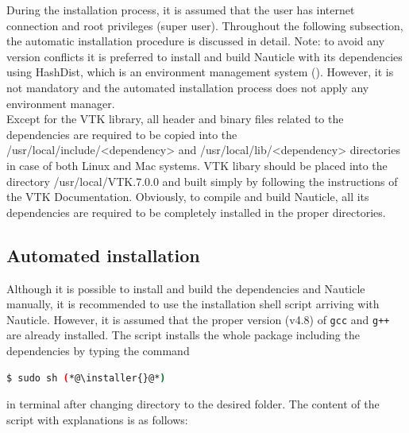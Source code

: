 \documentclass[a4paper,12pt,openany]{book}
\newcommand{\myhref}[3][nauticlegreen_dark]{\href{#2}{\color{#1}{#3}}}%
\theoremstyle{break}
\begin{document}
During the installation process, it is assumed that the user has internet connection and root privileges (super user). Throughout the following subsection, the automatic installation procedure is discussed in detail.
Note: to avoid any version conflicts it is preferred to install and build Nauticle with its dependencies using HashDist, which is an environment management system (\myhref{https://github.com/hashdist/hashdist}{https://github.com/hashdist/ hashdist}). However, it is not mandatory and the automated installation process does not apply any environment manager. \\
Except for the VTK library, all header and binary files related to the dependencies are required to be copied into the /usr/local/include/<dependency> and /usr/local/lib/<dependency> directories in case of both Linux and Mac systems. VTK libary should be placed into the directory /usr/local/VTK.7.0.0 and built simply by following the instructions of the VTK Documentation. Obviously, to compile and build Nauticle, all its dependencies are required to be completely installed in the proper directories. 
\subsection{Automated installation}
Although it is possible to install and build the dependencies and Nauticle manually, it is recommended to use the installation shell script arriving with Nauticle. However, it is assumed that the proper version (v4.8) of \texttt{gcc} and \texttt{g++} are already installed. The script installs the whole package including the dependencies by typing the command
\begin{lstlisting}[language=bash]
  $ sudo sh (*@\installer{}@*)
\end{lstlisting}
in terminal after changing directory to the desired folder. The content of the script with explanations is as follows:
\end{document}
